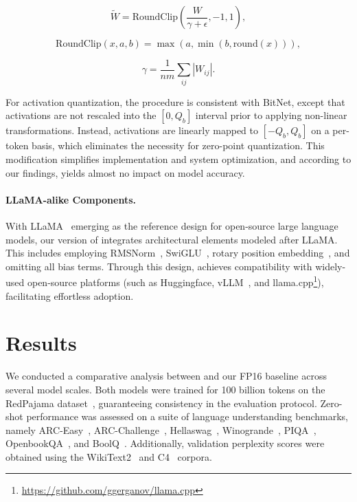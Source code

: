 \begin{equation}
    \widetilde{W} = \mathrm{RoundClip}(\frac{W}{\gamma + \epsilon}, -1, 1),
\end{equation}

\begin{equation}
    \mathrm{RoundClip}(x, a, b) = \max(a, \min(b, \mathrm{round}(x))),
\end{equation}

\begin{equation}
    \gamma = \frac{1}{nm}\sum_{ij} |W_{ij}|.
\end{equation}

For activation quantization, the procedure is consistent with BitNet, except that activations are not rescaled into the $[0, Q_b]$ interval prior to applying non-linear transformations. Instead, activations are linearly mapped to $[-Q_b, Q_b]$ on a per-token basis, which eliminates the necessity for zero-point quantization. This modification simplifies implementation and system optimization, and according to our findings, yields almost no impact on model accuracy.

\paragraph{LLaMA-alike Components.}

With LLaMA~\cite{llama, llama2} emerging as the reference design for open-source large language models, our version of  integrates architectural elements modeled after LLaMA. This includes employing RMSNorm~\cite{rmsnorm}, SwiGLU~\cite{swiglu}, rotary position embedding~\cite{rope}, and omitting all bias terms. Through this design,  achieves compatibility with widely-used open-source platforms (such as Huggingface, vLLM~\cite{vllm}, and llama.cpp\footnote{\url{https://github.com/ggerganov/llama.cpp}}), facilitating effortless adoption.

\section{Results}

We conducted a comparative analysis between  and our FP16  baseline across several model scales. Both models were trained for 100 billion tokens on the RedPajama dataset~\cite{redpajama}, guaranteeing consistency in the evaluation protocol. Zero-shot performance was assessed on a suite of language understanding benchmarks, namely ARC-Easy~\cite{arc}, ARC-Challenge~\cite{arc}, Hellaswag~\cite{hellaswag}, Winogrande~\cite{winoGrande}, PIQA~\cite{piqa}, OpenbookQA~\cite{openbookqa}, and BoolQ~\cite{boolq}. Additionally, validation perplexity scores were obtained using the WikiText2~\cite{wikitext2} and C4~\cite{c4} corpora.

